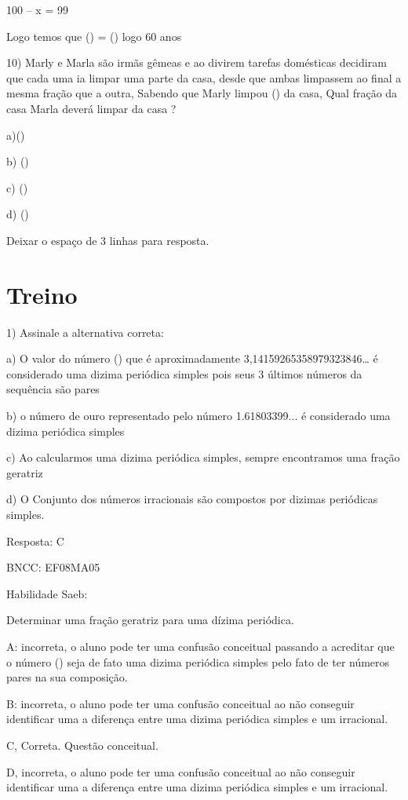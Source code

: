 100 -- x = 99

Logo temos que () = () logo 60 anos

10) Marly e Marla são irmãs gêmeas e ao divirem tarefas domésticas
decidiram que cada uma ia limpar uma parte da casa, desde que ambas
limpassem ao final a mesma fração que a outra, Sabendo que Marly limpou
() da casa, Qual fração da casa Marla deverá limpar da casa
?

a)()

b) ()

c) ()

d) ()

Deixar o espaço de 3 linhas para resposta.

\section{Treino}

1) Assinale a alternativa correta:

a) O valor do número (\pi) que é aproximadamente
3,14159265358979323846\ldots{} é considerado uma dizima periódica
simples pois seus 3 últimos números da sequência são pares

b) o número de ouro representado pelo número 1.61803399... é considerado
uma dizima periódica simples

c) Ao calcularmos uma dizima periódica simples, sempre encontramos uma
fração geratriz

d) O Conjunto dos números irracionais são compostos por dizimas
periódicas simples.

Resposta: C

BNCC: EF08MA05

Habilidade Saeb:

Determinar uma fração geratriz para uma dízima periódica.

A: incorreta, o aluno pode ter uma confusão conceitual passando a
acreditar que o número (\pi) seja de fato uma dizima periódica simples
pelo fato de ter números pares na sua composição.

B: incorreta, o aluno pode ter uma confusão conceitual ao não conseguir
identificar uma a diferença entre uma dizima periódica simples e um
irracional.

C, Correta. Questão conceitual.

D, incorreta, o aluno pode ter uma confusão conceitual ao não conseguir
identificar uma a diferença entre uma dizima periódica simples e um
irracional.

